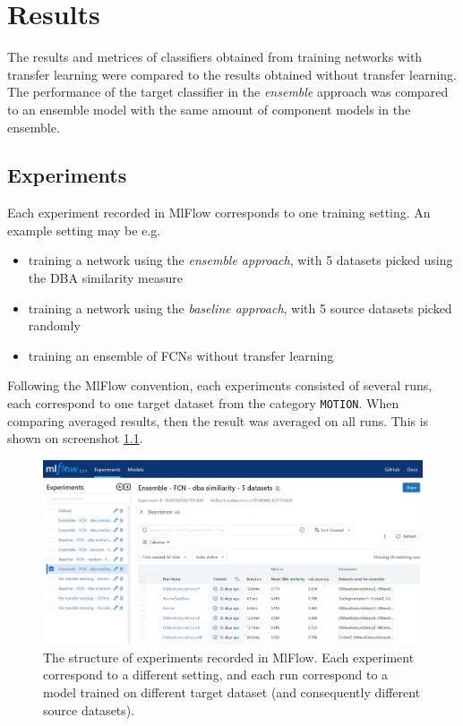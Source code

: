 \documentclass[a4paper,11pt,twoside]{report}
\theoremstyle{definition}
\begin{document}
\chapter{Results}
The results and metrices of classifiers obtained from training networks with transfer learning were compared to the results obtained without transfer learning. The performance of the target classifier in the\textit{ ensemble }approach was compared to an ensemble model with the same amount of component models in the ensemble.

\section{Experiments}
Each experiment recorded in MlFlow corresponds to one training setting. An example setting may be e.g. \begin{itemize}
\item training a network using the \textit{ensemble approach}, with 5 datasets picked using the DBA similarity measure
 \item training a network using the \textit{baseline approach}, with 5 source datasets picked randomly
 \item training an ensemble of FCNs without transfer learning

\end{itemize}
Following the MlFlow convention, each experiments consisted of several runs, each correspond to one target dataset from the category \texttt{MOTION}. When comparing averaged results, then the result was averaged on all runs. This is shown on screenshot \ref{fig:mlflow_screnshot}.


\FloatBarrier

\begin{figure}[h!t]
\centering
\includegraphics[width=17cm]{imgs/mlflow_screenshot.png}
\caption{The structure of experiments recorded in MlFlow. Each experiment correspond to a different setting, and each run correspond to a model trained on different target dataset (and consequently different source datasets).}
\label{fig:mlflow_screnshot}
\end{figure}
\FloatBarrier
\end{document}
